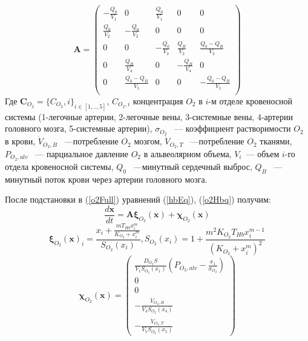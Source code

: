\begin{equation}
\mathbf{A}=\begin{pmatrix}
-\frac{Q_{0}}{V_{1}} & 0 & \frac{Q_{0}}{V_{1}} & 0 & 0 \\
\frac{Q_{0}}{V_{2}} & -\frac{Q_{0}}{V_{2}} & 0 & 0 & 0 \\
0 & 0 & -\frac{Q_{0}}{V_{3}} &  \frac{Q_{B}}{V_{3}} &  \frac{Q_{0}-Q_{B}}{V_{3}} \\
0 & \frac{Q_{B}}{V_{4}} & 0 & -\frac{Q_{B}}{V_{4}} & 0 \\
0 & \frac{Q_{0}-Q_{B}}{V_{5}} & 0 & 0 & -\frac{Q_{0}-Q_{B}}{V_{5}} \\
\end{pmatrix}
\end{equation}
Где $\mathbf{C}_{O_2} = \{ C_{O_2},i \}_{i \in [1,..,5]}$, $C_{O_2,i}$ концентрация $O_2$ в $i$-м отделе кровеносной системы (1-легочные артерии, 2-легочные вены, 3-системные вены, 4-артерии головного мозга, 5-системные артерии), \( \sigma_{O_{2}} \) ~--- коэффициент растворимости \( O_{2}\) в крови, \( \dot{V}_{O_{2},B}\) ~---потребление \( O_{2}\) мозгом, \( \dot{V}_{O_{2},T}\) ~---потребление \( O_{2}\) тканями, \( P_{O_{2},alv} \) ~--- парциальное давление \( O_{2}\) в альвеолярном объема, \( V_{i}\)~--- объем \(i\)-го отдела кровеносной системы, \( Q_{0}\) ~---минутный сердечный выброс, \( Q_{B}\) ~---минутный поток крови через артерии головного мозга.

После подстановки в (\ref{o2Full}) уравнений (\ref{hbEq}), (\ref{o2Hbq}) получим:
\begin{equation}
\displaystyle \frac{d\textbf{x}}{dt}
=\mathbf{A} \mathbf{\xi}_{O_{2}}(\textbf{x})+\mathbf{\chi}_{O_{2}}(\textbf{x})
\label{o2Free}
\end{equation}
\begin{equation}
\mathbf{\xi}_{O_{2}}(\mathbf{x})_{i}=\frac{\displaystyle x_{i}+\frac{m T_{Hb}x_{i}^{m}}{ K_{O_{2}}+x_{i}^m}}{S_{O_{2}}(x_{i})}, S_{O_{2}}(x_{i})=1+\frac{m^2K_{O_{2}}T_{Hb}x_{i}^{m-1}}{\left( K_{O_{2}}+x_{i}^m\right)^2}
\end{equation}
\begin{equation}
\mathbf{\chi}_{O_{2}}(\textbf{x})=\begin{pmatrix}
\displaystyle \frac{D_{O_{2}}S}{V_{1}S_{O_{2}}(x_{1})}\left(P_{O_{2},alv}-\frac{x_{1}}{\sigma_{O_{2}}} \right) \\
0 \\
0 \\
\displaystyle -\frac{\dot{V}_{O_{2},B}}{V_{4}S_{O_{2}}(x_{4})} \\
\displaystyle -\frac{\dot{V}_{O_{2},T}}{V_{5}S_{O_{2}}(x_{5})}
\end{pmatrix}
\label{o2source}
\end{equation}

